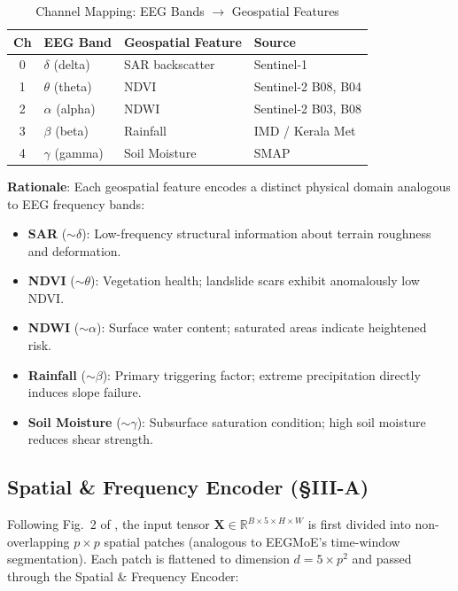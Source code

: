 \documentclass[conference]{IEEEtran}
\begin{document}
\begin{table}[h]
\centering
\caption{Channel Mapping: EEG Bands $\rightarrow$ Geospatial Features}
\label{tab:channel_mapping}
\begin{tabular}{@{}clll@{}}
\toprule
\textbf{Ch} & \textbf{EEG Band} & \textbf{Geospatial Feature} & \textbf{Source} \\
\midrule
0 & $\delta$ (delta) & SAR backscatter & Sentinel-1 \\
1 & $\theta$ (theta) & NDVI & Sentinel-2 B08, B04 \\
2 & $\alpha$ (alpha) & NDWI & Sentinel-2 B03, B08 \\
3 & $\beta$ (beta) & Rainfall & IMD / Kerala Met \\
4 & $\gamma$ (gamma) & Soil Moisture & SMAP \\
\bottomrule
\end{tabular}
\end{table}

\textbf{Rationale}: Each geospatial feature encodes a distinct physical domain analogous to EEG frequency bands:
\begin{itemize}
    \item \textbf{SAR} ($\sim\delta$): Low-frequency structural information about terrain roughness and deformation.
    \item \textbf{NDVI} ($\sim\theta$): Vegetation health; landslide scars exhibit anomalously low NDVI.
    \item \textbf{NDWI} ($\sim\alpha$): Surface water content; saturated areas indicate heightened risk.
    \item \textbf{Rainfall} ($\sim\beta$): Primary triggering factor; extreme precipitation directly induces slope failure.
    \item \textbf{Soil Moisture} ($\sim\gamma$): Subsurface saturation condition; high soil moisture reduces shear strength.
\end{itemize}

\subsection{Spatial \& Frequency Encoder (\S III-A)}

Following Fig.~2 of \cite{eegmoe2026}, the input tensor $\mathbf{X} \in \mathbb{R}^{B \times 5 \times H \times W}$ is first divided into non-overlapping $p \times p$ spatial patches (analogous to EEGMoE's time-window segmentation). Each patch is flattened to dimension $d = 5 \times p^2$ and passed through the Spatial \& Frequency Encoder:
\end{document}
